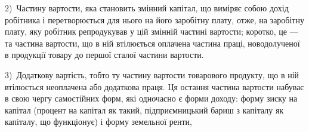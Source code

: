 2)~Частину вартости, яка становить змінний капітал, що виміряє собою
дохід робітника і перетворюється для нього на його заробітну плату, отже, на
заробітну плату, яку робітник репродукував у цій змінній частині вартости;
коротко, це — та частина вартости, що в ній втілюється оплачена частина
праці, новодолученої в продукції товару до першої сталої частини вартости.

3)~Додаткову вартість, тобто ту частину вартости товарового продукту,
що в ній втілюється неоплачена або додаткова праця. Ця остання частина
вартости набуває в свою чергу самостійних форм, які одночасно є форми
доходу: форму зиску на капітал (процент на капітал як такий, підприємницький
бариш з капіталу як капіталу, що функціонує) і форму земельної ренти,
\parbreak{}  %
